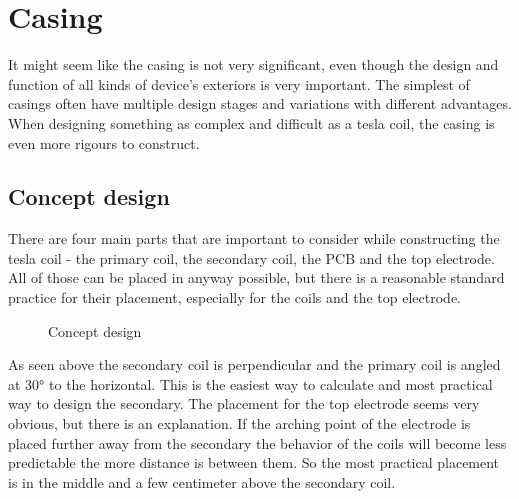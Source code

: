 \chapter{Casing}


It might seem like the casing is not very significant, even though the design and function of all kinds of device's exteriors is very important. The simplest of casings often have multiple design stages and variations with different advantages. When designing something as complex and difficult as a tesla coil, the casing is even more rigours to construct. 


\section{Concept design}
\label{sec:concept-design}

There are four main parts that are important to consider while constructing the tesla coil - the primary coil, the secondary coil, the PCB and the top electrode. All of those can be placed in anyway possible, but there is a reasonable standard practice for their placement, especially for the coils and the top electrode. 

\begin{figure}
    \centering
    \caption{Concept design}
    \label{BD-envision}
\end{figure}

As seen above the secondary coil is perpendicular and the primary coil is angled at 30° to the horizontal. This is the easiest way to calculate and most practical way to design the secondary. The placement for the top electrode seems very obvious, but there is an explanation. If the arching point of the electrode is placed further away from the secondary the behavior of the coils will become less predictable the more distance is between them. So the most practical placement is in the middle and a few centimeter above the secondary coil. 

